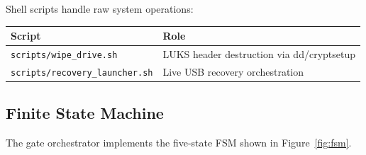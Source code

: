 \documentclass[11pt,letterpaper]{article}
\begin{document}
Shell scripts handle raw system operations:

{\centering\begin{tabularx}{\textwidth}{L{6.0cm} Y}
\toprule
\textbf{Script} & \textbf{Role} \\
\midrule
\texttt{scripts/wipe\_drive.sh} & LUKS header destruction via dd/cryptsetup \\
\texttt{scripts/recovery\_launcher.sh} & Live USB recovery orchestration \\
\bottomrule
\end{tabularx}\par}

\subsection{Finite State Machine}

The gate orchestrator implements the five-state FSM shown in Figure~\ref{fig:fsm}.
\end{document}
